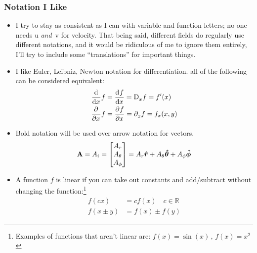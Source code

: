 \subsubsection*{Notation I Like}  
    \begin{itemize}
    \item I try to stay as consistent as I can with variable and function letters; no one needs u {\sl and\/}~v for velocity. That being said, different fields do regularly use different notations, and it would be ridiculous of me to ignore them entirely, I'll try to include some ``translations'' for important things.
    \item
    I like Euler, Leibniz, Newton notation for differentiation. all of the following can be considered equivalent: 
    \begin{align*}
        \der{x}f&=\der{f}{x}=\der*{x}f=f'(x)
        \\
        \pder{x}f&=\pder{f}{x}=\pder*{x}f=f_x(x,y)
    \end{align*}
    \item Bold notation will be used over arrow notation for vectors.  
    \begin{equation*}
        \vb{A}= A_i=
        \begin{bmatrix}
        A_r
        \\
        A_\theta
        \\
        A_\phi
        \end{bmatrix} =A_r\e{r}+A_\theta\e{\theta}+A_\phi\e{\phi}
    \end{equation*}   
    \item A function $f$ is linear if you can take out constants and add/subtract without changing the function:\footnote{Examples of functions that aren't linear are: \(f(x)=\sin(x)\,,\,f(x)= x^2\)}
    \begin{align*}
        f(cx)&=cf(x)\quad c\in \mathbb{R}
        \\
        f(x\pm y)&=f(x)\pm f(y)
    \end{align*}
    \end{itemize}
\newpage{} %
\endinput